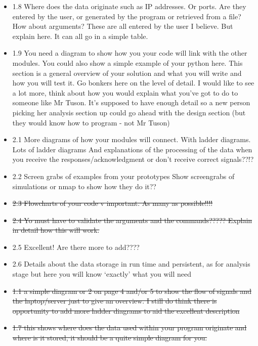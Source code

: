 \documentclass{article}
\begin{document}
\begin{itemize}
  \item{1.8 Where does the data originate such as IP addresses. Or ports. Are they entered by the user, or generated by the program or retrieved from a file? How about arguments? These are all entered by the user I believe. But explain here. It can all go in a simple table. }

  \item{1.9 You need a diagram to show how you your code will link with the other modules.  You could also show a simple example of your python here. This section is a general overview of your solution and what you will write and how you will test it. Go bonkers here on the level of detail. I would like to see a lot more, think about how you would explain what you’ve got to do to someone like Mr Tuson. It’s supposed to have enough detail so a new person picking her analysis section up could go ahead with the design section (but they would know how to program - not Mr Tuson)}

  \item{2.1 More diagrams of how your modules will connect. With ladder diagrams.  Lots of ladder diagrams And explanations of the processing of the data when you receive the responses/acknowledgment or don’t receive correct signals??!?}

  \item{2.2 Screen grabs of examples from your prototypes  Show screengrabs of simulations or nmap to show how they do it??}

  \item{\sout{2.3 Flowcharts of your code v important.  As many as possible!!!!}}

  \item{\sout{2.4 Yo must have to validate the arguments and the commands????? Explain in detail how this will work. }}

  \item{2.5 Excellent! Are there more to add????}

  \item{2.6 Details about the data storage in run time and persistent, as for analysis stage but here you will know ‘exactly’ what you will need }

  \item{\sout{1.1 a simple diagram or 2 on page 4 and/or 5 to show the flow of signals and the laptop/server just to give an overview.  I still do think there is opportunity to add more ladder diagrams to aid the excellent description}}

  \item{\sout{1.7 this shows where does the data used within your program originate and where is it stored, it should be a quite simple diagram for you.}}


\end{itemize}
\end{document}
